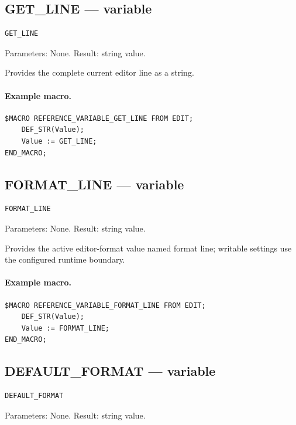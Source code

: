 \documentclass[a4paper,10pt,twoside,openany]{book}
\begin{document}
\label{prim:variable-get-line}
\subsection*{GET\_LINE --- variable}
\begin{verbatim}
GET_LINE
\end{verbatim}
Parameters: None. Result: string value.

Provides the complete current editor line as a string.

\paragraph{Example macro.}
\begin{verbatim}
$MACRO REFERENCE_VARIABLE_GET_LINE FROM EDIT;
    DEF_STR(Value);
    Value := GET_LINE;
END_MACRO;
\end{verbatim}

\label{prim:variable-format-line}
\subsection*{FORMAT\_LINE --- variable}
\begin{verbatim}
FORMAT_LINE
\end{verbatim}
Parameters: None. Result: string value.

Provides the active editor-format value named format line; writable settings use the configured runtime boundary.

\paragraph{Example macro.}
\begin{verbatim}
$MACRO REFERENCE_VARIABLE_FORMAT_LINE FROM EDIT;
    DEF_STR(Value);
    Value := FORMAT_LINE;
END_MACRO;
\end{verbatim}

\label{prim:variable-default-format}
\subsection*{DEFAULT\_FORMAT --- variable}
\begin{verbatim}
DEFAULT_FORMAT
\end{verbatim}
Parameters: None. Result: string value.
\end{document}
